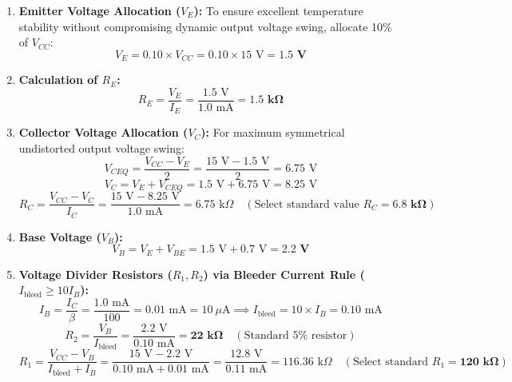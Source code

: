 \documentclass[11pt,a4paper,oneside]{book}
\begin{document}
\begin{enumerate}[leftmargin=1.5em]
  \item \textbf{Emitter Voltage Allocation ($V_E$):}
  To ensure excellent temperature stability without compromising dynamic output voltage swing, allocate 10\% of $V_{CC}$:
  \[
  V_E = 0.10 \times V_{CC} = 0.10 \times 15\text{ V} = \mathbf{1.5\text{ V}}
  \]
  \item \textbf{Calculation of $R_E$:}
  \[
  R_E = \frac{V_E}{I_E} = \frac{1.5\text{ V}}{1.0\text{ mA}} = \mathbf{1.5\text{ k}\Omega}
  \]
  \item \textbf{Collector Voltage Allocation ($V_C$):}
  For maximum symmetrical undistorted output voltage swing:
  \[
  V_{CEQ} = \frac{V_{CC} - V_E}{2} = \frac{15\text{ V} - 1.5\text{ V}}{2} = 6.75\text{ V}
  \]
  \[
  V_C = V_E + V_{CEQ} = 1.5\text{ V} + 6.75\text{ V} = 8.25\text{ V}
  \]
  \[
  R_C = \frac{V_{CC} - V_C}{I_C} = \frac{15\text{ V} - 8.25\text{ V}}{1.0\text{ mA}} = 6.75\text{ k}\Omega \quad (\text{Select standard value } R_C = \mathbf{6.8\text{ k}\Omega})
  \]
  \item \textbf{Base Voltage ($V_B$):}
  \[
  V_B = V_E + V_{BE} = 1.5\text{ V} + 0.7\text{ V} = \mathbf{2.2\text{ V}}
  \]
  \item \textbf{Voltage Divider Resistors ($R_1, R_2$) via Bleeder Current Rule ($I_{\text{bleed}} \ge 10 I_B$):}
  \[
  I_B = \frac{I_C}{\beta} = \frac{1.0\text{ mA}}{100} = 0.01\text{ mA} = 10\ \mu\text{A} \implies I_{\text{bleed}} = 10 \times I_B = 0.10\text{ mA}
  \]
  \[
  R_2 = \frac{V_B}{I_{\text{bleed}}} = \frac{2.2\text{ V}}{0.10\text{ mA}} = \mathbf{22\text{ k}\Omega} \quad (\text{Standard } 5\% \text{ resistor})
  \]
  \[
  R_1 = \frac{V_{CC} - V_B}{I_{\text{bleed}} + I_B} = \frac{15\text{ V} - 2.2\text{ V}}{0.10\text{ mA} + 0.01\text{ mA}} = \frac{12.8\text{ V}}{0.11\text{ mA}} = 116.36\text{ k}\Omega \quad (\text{Select standard } R_1 = \mathbf{120\text{ k}\Omega})
  \]
\end{enumerate}
\end{document}
